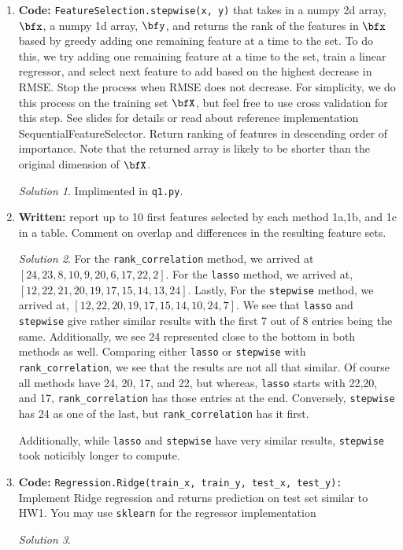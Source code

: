 \documentclass[a4paper,12pt]{article}
\theoremstyle{definition}
\theoremstyle{remark}
\newtheorem*{solution}{Solution}
\begin{document}
\begin{enumerate}
\begin{enumerate}
			\item {\bf Code:} {\tt FeatureSelection.stepwise(x, y)} that takes in a numpy 2d array, $\bfx$, a numpy 1d array, $\bfy$, and returns the rank of the features in $\bfx$ based by greedy adding one remaining feature at a time to the set. To do this, we try adding one remaining feature at a time to the set, train a linear regressor, and select next feature to add based on the highest decrease in RMSE. Stop the process when RMSE does not decrease. For simplicity, we do this process on the training set $\bfX$, but feel free to use cross validation for this step. See slides for details or read about reference implementation SequentialFeatureSelector. Return ranking of features in descending order of importance. Note that the returned array is likely to be shorter than the original dimension of $\bfX$.
			\begin{solution}
					Implimented in \texttt{q1.py}.
			\end{solution}
			\item {\bf Written:} report up to 10 first features selected by each method 1a,1b, and 1c in a table. Comment on overlap and
			differences in the resulting feature sets.
			\begin{solution}
				For the {\tt rank\_correlation} method, we arrived at $[24, 23,  8, 10,  9, 20,  6, 17, 22,  2]$. For the {\tt lasso} method, we arrived at, $[12, 22, 21, 20, 19, 17, 15, 14, 13, 24]$. Lastly, For the {\tt stepwise} method, we arrived at, $[12, 22, 20, 19, 17, 15, 14, 10, 24,  7]$. We see that {\tt lasso} and {\tt stepwise} give rather similar results with the first 7 out of 8 entries being the same. Additionally, we see 24 represented close to the bottom in both methods as well. Comparing either {\tt lasso} or {\tt stepwise} with {\tt rank\_correlation}, we see that the results are not all that similar. Of course all methods have 24, 20, 17, and 22, but whereas, {\tt lasso} starts with 22,20, and 17, {\tt rank\_correlation} has those entries at the end. Conversely, {\tt stepwise } has 24 as one of the last, but {\tt rank\_correlation} has it first. 
				
				Additionally, while {\tt lasso} and {\tt stepwise} have very similar results, {\tt stepwise} took noticibly longer to compute.
			\end{solution}
			\item {\bf Code:} {\tt Regression.Ridge(train\_x, train\_y, test\_x, test\_y):} Implement Ridge regression and returns prediction on test set similar to HW1. You may use {\tt sklearn} for the regressor implementation
			\begin{solution}
				 

\end{solution}
\end{enumerate}
\end{enumerate}
\end{document}
